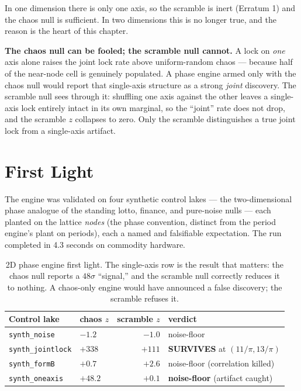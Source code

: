 \documentclass[11pt, letterpaper, openany]{book}
\begin{document}
In one dimension there is only one axis, so the scramble is inert (Erratum 1) and the chaos null is
sufficient. In two dimensions this is no longer true, and the reason is the heart of this chapter.

\begin{signalbox}
\textbf{The chaos null can be fooled; the scramble null cannot.} A lock on \emph{one} axis alone
raises the joint lock rate above uniform-random chaos --- because half of the near-node cell is
genuinely populated. A phase engine armed only with the chaos null would report that single-axis
structure as a strong \emph{joint} discovery. The scramble null sees through it: shuffling one axis
against the other leaves a single-axis lock entirely intact in its own marginal, so the ``joint''
rate does not drop, and the scramble $z$ collapses to zero. Only the scramble distinguishes a true
joint lock from a single-axis artifact.
\end{signalbox}

\section{First Light}

The engine was validated on four synthetic control lakes --- the two-dimensional phase analogue of
the standing lotto, finance, and pure-noise nulls --- each planted on the lattice \emph{nodes} (the
phase convention, distinct from the period engine's plant on periods), each a named and falsifiable
expectation. The run completed in 4.3 seconds on commodity hardware.

\begin{table}[H]
\centering
\small
\begin{tabular}{@{}llrl@{}}
\toprule
\textbf{Control lake} & \textbf{chaos $z$} & \textbf{scramble $z$} & \textbf{verdict} \\
\midrule
\texttt{synth\_noise} & $-1.2$ & $-1.0$ & noise-floor \\
\texttt{synth\_jointlock} & $+338$ & $+111$ & \textbf{SURVIVES} at $(11/\pi, 13/\pi)$ \\
\texttt{synth\_formB} & $+0.7$ & $+2.6$ & noise-floor (correlation killed) \\
\texttt{synth\_oneaxis} & $\mathbf{+48.2}$ & $\mathbf{+0.1}$ & \textbf{noise-floor} (artifact caught) \\
\bottomrule
\end{tabular}
\caption{2D phase engine first light. The single-axis row is the result that matters: the chaos
null reports a $48\sigma$ ``signal,'' and the scramble null correctly reduces it to nothing. A
chaos-only engine would have announced a false discovery; the scramble refuses it.}
\end{table}
\end{document}
